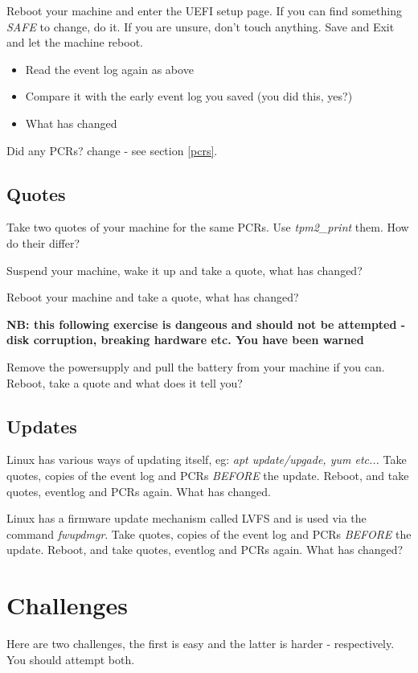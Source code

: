 \documentclass[11pt,a4paper]{article}
\begin{document}
Reboot your machine and enter the UEFI setup page. If you can find something \textit{SAFE} to change, do it. If you are unsure, don't touch anything. Save and Exit and let the machine reboot.

\begin{itemize}
 \item Read the event log again as above
 \item Compare it with the early event log you saved (you did this, yes?)
 \item What has changed
\end{itemize}

Did any PCRs? change - see section \ref{pcrs}.

\subsection{Quotes}
Take two quotes of your machine for the same PCRs. Use \textit{tpm2\_print} them. How do their differ?

Suspend your machine, wake it up and take a quote, what has changed?

Reboot your machine and take a quote, what has changed?

\textbf{NB: this following exercise is dangeous and should not be attempted - disk corruption, breaking hardware etc. You have been warned}

Remove the powersupply and pull the battery from your machine if you can. Reboot, take a quote and what does it tell you?

\subsection{Updates}
Linux has various ways of updating itself, eg: \textit{apt update/upgade, yum etc...} Take quotes, copies of the event log and PCRs \textit{BEFORE} the update. Reboot, and take quotes, eventlog and PCRs again.  What has changed.

Linux has a firmware update mechanism called LVFS and is used via the command \textit{fwupdmgr}. Take quotes, copies of the event log and PCRs \textit{BEFORE} the update. Reboot, and take quotes, eventlog and PCRs again.  What has changed?




\section{Challenges}
Here are two challenges, the first is easy and the latter is harder - respectively. You should attempt both.
\end{document}
